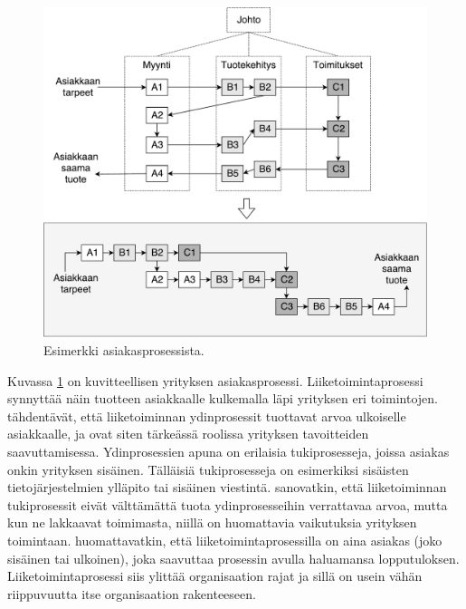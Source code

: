 \documentclass[finnish,12pt,a4paper,pdftex]{article}
\begin{document}
\begin{figure}[!h]
    \centering
    \includegraphics[scale=0.45]{images/Prosessikaavion.pdf}
    \caption{Esimerkki asiakasprosessista. \citep{ohjelmistotuotanto}}
    \label{fig:liikark}
\end{figure}

Kuvassa \ref{fig:liikark} on kuvitteellisen yrityksen asiakasprosessi. Liiketoimintaprosessi synnyttää näin tuotteen asiakkaalle kulkemalla läpi yrityksen eri toimintojen. \cite{ohjelmistotuotanto} tähdentävät, että liiketoiminnan ydinprosessit tuottavat arvoa ulkoiselle asiakkaalle, ja ovat siten tärkeässä roolissa yrityksen tavoitteiden saavuttamisessa. Ydinprosessien apuna on erilaisia tukiprosesseja, joissa asiakas onkin yrityksen sisäinen. Tälläisiä tukiprosesseja on esimerkiksi sisäisten tietojärjestelmien ylläpito tai sisäinen viestintä. \cite{okaytannot} sanovatkin, että liiketoiminnan tukiprosessit eivät välttämättä tuota ydinprosesseihin verrattavaa arvoa, mutta kun ne lakkaavat toimimasta, niillä on huomattavia vaikutuksia yrityksen toimintaan. \citeauthor{okaytannot} huomattavatkin, että liiketoimintaprosessilla on aina asiakas (joko sisäinen tai ulkoinen), joka saavuttaa prosessin avulla haluamansa lopputuloksen. Liiketoimintaprosessi siis ylittää organisaation rajat ja sillä on usein vähän riippuvuutta itse organisaation rakenteeseen.
\end{document}

